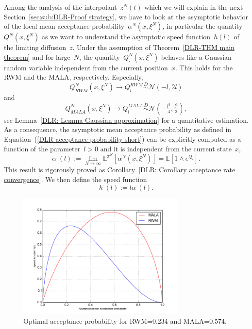 Among the analysis of the interpolant~$z^N(t)$ which we will explain in the next Section~\ref{sec:sub:DLR-Proof strategy}, we have to look at the asymptotic behavior of the local mean acceptance probability~$\alpha^{N} (x, \xi^{N})$, in particular the quantity~$Q^{N}_{\cdot}(x, \xi^{N})$ as we want to understand the asymptotic speed function~$h(l)$ of the limiting diffusion~$z$. Under the assumption of Theorem~\ref{DLR-THM main theorem} and for large~$N$, the quantity~$Q^{N}_{\cdot}(x, \xi^{N})$ behaves like a Gaussian random variable independent from the current position~$x$. This holds for the RWM and the MALA, respectively. Especially, 
\begin{equation}
\label{DLR-Gaussian RWM short}
 Q^{N}_{RWM}(x, \xi^{N}) \to Q_l^{RWM} \stackrel{D}{\sim} \mathcal{N}(-l, 2l)
\end{equation}
and
\begin{equation}
\label{DLR-Gaussian MALA short}
 Q^{N}_{MALA}(x, \xi^{N}) \to Q_l^{MALA} \stackrel{D}{\sim} \mathcal{N}(-\tfrac{l^3}{4}, \tfrac{l^3}{2}),
\end{equation}
see Lemma~\ref{DLR: Lemma Gaussian approximation} for a quantitative estimation.  As a consequence, the asymptotic mean acceptance probability as defined in Equation~(\ref{DLR-acceptance probability short}) can be explicitly  computed  as a function of the parameter~$l>0$ and it is independent from the current state~$x$,
\begin{equation}
\label{DLR-asymptotic mean acceptance probability}
 \alpha^{\cdot}(l) := \lim_{N \to \infty}  \mathbb{E}^{\pi^N} \left[ \alpha^N(x, \xi^N) \right] = \mathbb{E} \left[ 1 \wedge e^{Q_l^{\cdot}} \right].
\end{equation}
This result is rigorously proved as Corollary~\ref{DLR: Corollary acceptance rate convergence}. We then define the speed function
\begin{equation}
 h^{\cdot}(l) := l \alpha^{\cdot}(l).
\end{equation}

\begin{figure}[htb]
 \begin{center} 
  \includegraphics[width=0.75\textwidth]{speedmeasures}
 \end{center}
  \caption{Optimal acceptance probability for RWM=0.234 and MALA=0.574.}
  \label{fig:optimal acceptance probability}
\end{figure}

